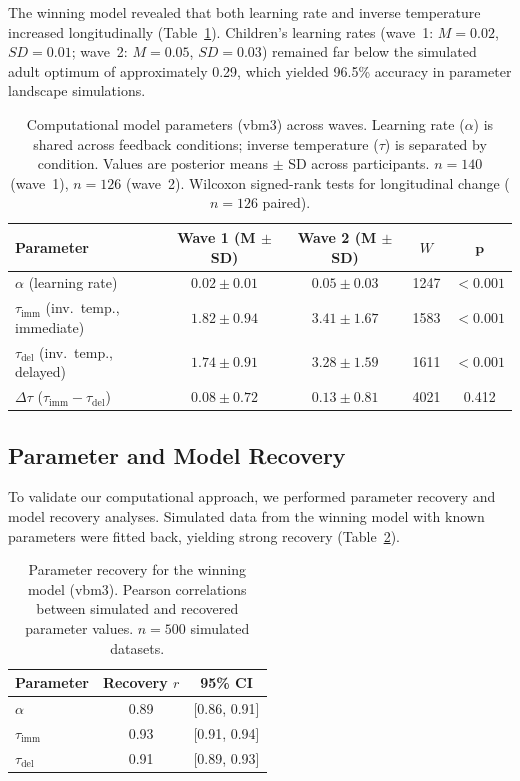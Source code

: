 \documentclass[11pt]{article}
\begin{document}
The winning model revealed that both learning rate and inverse temperature increased longitudinally (Table~\ref{tab:comp_params}). Children's learning rates (wave~1: $M = 0.02$, $SD = 0.01$; wave~2: $M = 0.05$, $SD = 0.03$) remained far below the simulated adult optimum of approximately 0.29, which yielded 96.5\% accuracy in parameter landscape simulations.

\begin{table}[H]
\centering
\caption{Computational model parameters (vbm3) across waves. Learning rate ($\alpha$) is shared across feedback conditions; inverse temperature ($\tau$) is separated by condition. Values are posterior means $\pm$ SD across participants. $n = 140$ (wave~1), $n = 126$ (wave~2). Wilcoxon signed-rank tests for longitudinal change ($n = 126$ paired).}
\label{tab:comp_params}
\begin{tabular}{lcccc}
\toprule
\textbf{Parameter} & \textbf{Wave 1 (M $\pm$ SD)} & \textbf{Wave 2 (M $\pm$ SD)} & \textbf{$W$} & $\boldsymbol{p}$ \\
\midrule
$\alpha$ (learning rate) & $0.02 \pm 0.01$ & $0.05 \pm 0.03$ & 1247 & $< 0.001$ \\
$\tau_{\text{imm}}$ (inv.\ temp., immediate) & $1.82 \pm 0.94$ & $3.41 \pm 1.67$ & 1583 & $< 0.001$ \\
$\tau_{\text{del}}$ (inv.\ temp., delayed) & $1.74 \pm 0.91$ & $3.28 \pm 1.59$ & 1611 & $< 0.001$ \\
$\Delta\tau$ ($\tau_{\text{imm}} - \tau_{\text{del}}$) & $0.08 \pm 0.72$ & $0.13 \pm 0.81$ & 4021 & 0.412 \\
\bottomrule
\end{tabular}
\end{table}

\subsection{Parameter and Model Recovery}

To validate our computational approach, we performed parameter recovery and model recovery analyses. Simulated data from the winning model with known parameters were fitted back, yielding strong recovery (Table~\ref{tab:recovery}).

\begin{table}[H]
\centering
\caption{Parameter recovery for the winning model (vbm3). Pearson correlations between simulated and recovered parameter values. $n = 500$ simulated datasets.}
\label{tab:recovery}
\begin{tabular}{lcc}
\toprule
\textbf{Parameter} & \textbf{Recovery $r$} & \textbf{95\% CI} \\
\midrule
$\alpha$ & 0.89 & [0.86, 0.91] \\
$\tau_{\text{imm}}$ & 0.93 & [0.91, 0.94] \\
$\tau_{\text{del}}$ & 0.91 & [0.89, 0.93] \\
\bottomrule
\end{tabular}
\end{table}
\end{document}
